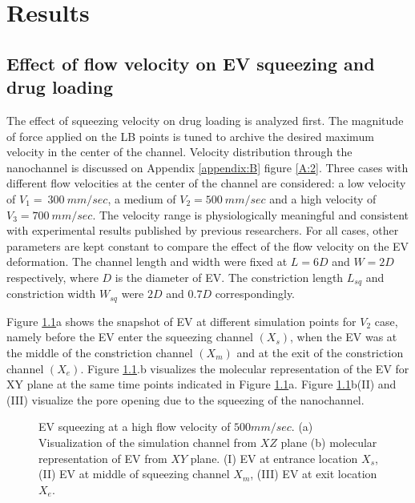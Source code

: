 \chapter{Results}

\section{Effect of flow velocity on EV squeezing and drug loading}

The effect of squeezing velocity on drug loading is analyzed first. The magnitude of force applied on the LB points is tuned to archive the desired maximum velocity in the center of the channel. Velocity distribution through the nanochannel is discussed on Appendix \ref{appendix:B} figure \ref{A:2}. Three cases with different flow velocities at the center of the channel are considered: a low velocity of $V_1=\ 300\ mm/sec$, a medium of $V_2=500\ mm/sec$ and a high velocity of $V_3=700\ mm/sec$. The velocity range is physiologically meaningful and consistent with experimental results published by previous researchers\cite{a64,a67}. For all cases, other parameters are kept constant to compare the effect of the flow velocity on the EV deformation. The channel length and width were fixed at $L=6D$ and $W=2D$ respectively, where $D$ is the diameter of EV. The constriction length  $L_{sq}$ and constriction width $W_{sq}$ were $2D$ and $0.7D$ correspondingly.

Figure \ref{fig:4}a shows the snapshot of EV at different simulation points for $V_2$ case, namely before the EV enter the squeezing channel $(X_s)$, when the EV was at the middle of the constriction channel $\left(X_m\right)$ and at the exit of the constriction channel $\left(X_e\right)$. Figure \ref{fig:4}.b visualizes the molecular representation of the EV for XY plane at the same time points indicated in Figure \ref{fig:4}a. Figure \ref{fig:4}b(II) and (III) visualize the pore opening due to the squeezing of the nanochannel. 

\begin{figure}[htbp]
  \centering
  
  \vspace{0.5cm}
  \caption{EV squeezing at a high flow velocity of $500 mm/sec$. (a) Visualization of the simulation channel from $XZ$ plane (b) molecular representation of EV from $XY$ plane. (I) EV at entrance location $X_s$, (II) EV at middle of squeezing channel $X_m$,  (III) EV at exit location $X_e$.}
  \label{fig:4}
\end{figure}

